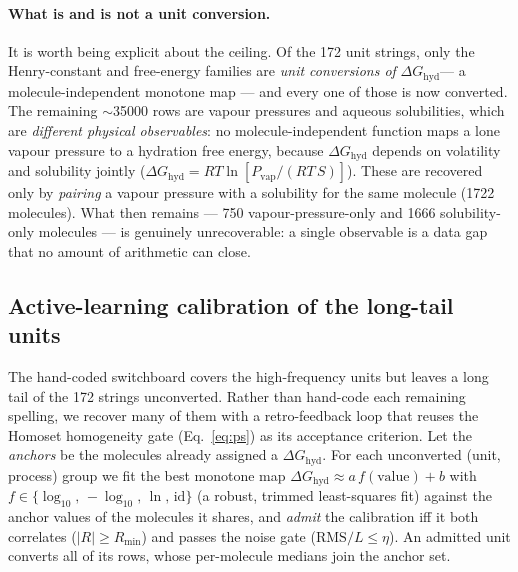 \documentclass[11pt]{article}
\newcommand{\dGhyd}{\ensuremath{\Delta G_{\mathrm{hyd}}}}
\begin{document}
\paragraph{What is and is not a unit conversion.} It is worth being explicit about the ceiling.
Of the \num{172} unit strings, only the Henry-constant and free-energy families are
\emph{unit conversions of} \dGhyd --- a molecule-independent monotone map --- and every one of
those is now converted. The remaining $\sim$\num{35000} rows are vapour pressures and aqueous
solubilities, which are \emph{different physical observables}: no molecule-independent function
maps a lone vapour pressure to a hydration free energy, because $\dGhyd$ depends on volatility and
solubility jointly ($\dGhyd = RT\ln[P_{\mathrm{vap}}/(RT\,S)]$). These are recovered only by
\emph{pairing} a vapour pressure with a solubility for the same molecule (\num{1722} molecules).
What then remains --- \num{750} vapour-pressure-only and \num{1666} solubility-only molecules --- is
genuinely unrecoverable: a single observable is a data gap that no amount of arithmetic can close.

\subsection{Active-learning calibration of the long-tail units}
\label{sec:activeloop}
The hand-coded switchboard covers the high-frequency units but leaves a long tail of the 172
strings unconverted. Rather than hand-code each remaining spelling, we recover many of them with
a retro-feedback loop that reuses the Homoset homogeneity gate (Eq.~\eqref{eq:ps}) as its
acceptance criterion. Let the \emph{anchors} be the molecules already assigned a $\dGhyd$. For
each unconverted (unit, process) group we fit the best monotone map
$\dGhyd \approx a\,f(\text{value}) + b$ with $f\in\{\log_{10},\,-\log_{10},\,\ln,\,\text{id}\}$
(a robust, trimmed least-squares fit) against the anchor values of the molecules it shares, and
\emph{admit} the calibration iff it both correlates ($|R|\ge R_{\min}$) and passes the noise gate
($\mathrm{RMS}/L\le\eta$). An admitted unit converts all of its rows, whose per-molecule medians
join the anchor set.
\end{document}
